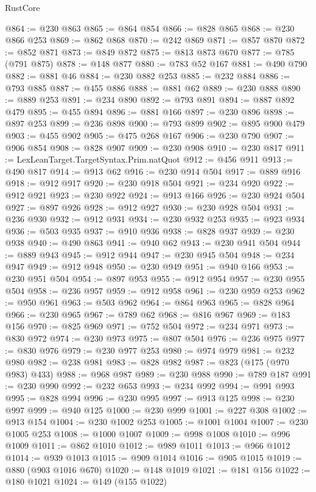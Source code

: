 \begin{lexlean}{RustCore}
\begin{coremodule}
@864 := @230 @863
@865 := @864 @854
@866 := @828 @865
@868 := @230 @866 @253
@869 := @862 @868
@870 := @242 @869
@871 := @857 @870
@872 := @852 @871
@873 := @849 @872
@875 := @813 @873 @670
@877 := @785 (@791 @875)
@878 := @148 @877
@880 := @783 @52 @167
@881 := @490 @790
@882 := @881 @46
@884 := @230 @882 @253
@885 := @232 @884
@886 := @793 @885
@887 := @455 @886
@888 := @881 @62
@889 := @230 @888
@890 := @889 @253
@891 := @234 @890
@892 := @793 @891
@894 := @887 @892 @479
@895 := @455 @894
@896 := @881 @166
@897 := @230 @896
@898 := @897 @253
@899 := @236 @898
@900 := @793 @899
@902 := @895 @900 @479
@903 := @455 @902
@905 := @475 @268 @167
@906 := @230 @790
@907 := @906 @854
@908 := @828 @907
@909 := @230 @908
@910 := @230 @817
@911 := LexLeanTarget.TargetSyntax.Prim.natQuot
@912 := @456 @911
@913 := @490 @817
@914 := @913 @62
@916 := @230 @914 @504
@917 := @889 @916
@918 := @912 @917
@920 := @230 @918 @504
@921 := @234 @920
@922 := @912 @921
@923 := @230 @922
@924 := @913 @166
@926 := @230 @924 @504
@927 := @897 @926
@928 := @912 @927
@930 := @230 @928 @504
@931 := @236 @930
@932 := @912 @931
@934 := @230 @932 @253
@935 := @923 @934
@936 := @503 @935
@937 := @910 @936
@938 := @828 @937
@939 := @230 @938
@940 := @490 @863
@941 := @940 @62
@943 := @230 @941 @504
@944 := @889 @943
@945 := @912 @944
@947 := @230 @945 @504
@948 := @234 @947
@949 := @912 @948
@950 := @230 @949
@951 := @940 @166
@953 := @230 @951 @504
@954 := @897 @953
@955 := @912 @954
@957 := @230 @955 @504
@958 := @236 @957
@959 := @912 @958
@961 := @230 @959 @253
@962 := @950 @961
@963 := @503 @962
@964 := @864 @963
@965 := @828 @964
@966 := @230 @965
@967 := @789 @62
@968 := @816 @967
@969 := @183 @156
@970 := @825 @969
@971 := @752 @504
@972 := @234 @971
@973 := @830 @972
@974 := @230 @973
@975 := @807 @504
@976 := @236 @975
@977 := @830 @976
@979 := @230 @977 @253
@980 := @974 @979
@981 := @232 @980
@982 := @238 @981
@983 := @828 @982
@987 := @823 (@175 (@970 @983) @433)
@988 := @968 @987
@989 := @230 @988
@990 := @789 @187
@991 := @230 @990
@992 := @232 @653
@993 := @234 @992
@994 := @991 @993
@995 := @828 @994
@996 := @230 @995
@997 := @913 @125
@998 := @230 @997
@999 := @940 @125
@1000 := @230 @999
@1001 := @227 @308
@1002 := @913 @154
@1004 := @230 @1002 @253
@1005 := @1001 @1004
@1007 := @230 @1005 @253
@1008 := @1000 @1007
@1009 := @998 @1008
@1010 := @996 @1009
@1011 := @862 @1010
@1012 := @989 @1011
@1013 := @966 @1012
@1014 := @939 @1013
@1015 := @909 @1014
@1016 := @905 @1015
@1019 := @880 (@903 @1016 @670)
@1020 := @148 @1019
@1021 := @181 @156
@1022 := @180 @1021
@1024 := @149 (@155 @1022)

\end{coremodule}
\end{lexlean}
